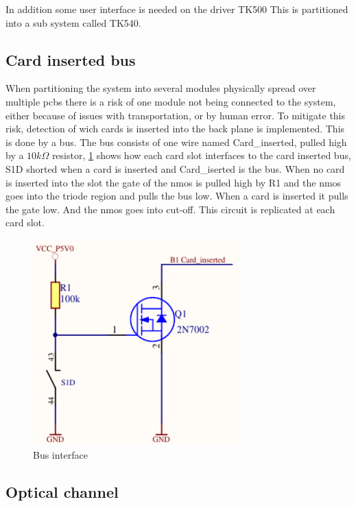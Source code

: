 In addition some user interface is needed on the driver TK500 This is partitioned into a sub system called TK540.


 
\subsection{Card inserted bus}
\label{section:ci}
When partitioning the system into several modules physically spread over multiple pcbs there is a risk of one module not being connected to the system, either because of issues with transportation, or by human error. To mitigate this risk, detection of wich cards is inserted into the back plane is implemented. This is done by a bus.
The bus consists of one wire named Card\_inserted, pulled high by a $10k\Omega$ resistor, \cref{fig:ki_bi} shows how each card slot interfaces to the card inserted bus, S1D shorted when a card is inserted and Card\_iserted is the bus. When no card is inserted into the slot the gate of the nmos is pulled high by R1 and the nmos goes into the triode region and pulls the bus low. When a card is inserted it pulls the gate low. And the nmos goes into cut-off. This circuit is replicated at each card slot.

\begin{figure}[h]
    \centering
    \includegraphics[width=8cm]{img/KI_BUS.pdf}
    \caption{Bus interface}
    \label{fig:ki_bi}
\end{figure}

\subsection{Optical channel}
\label{optical}

